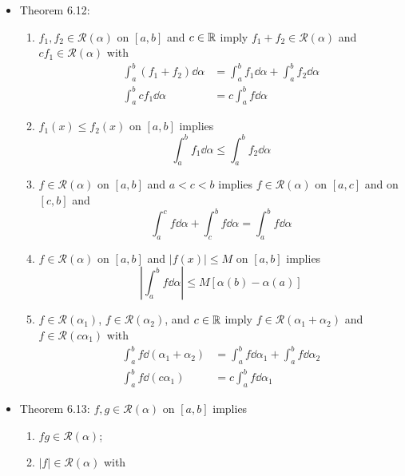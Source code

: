 \documentclass[../../notes.tex]{subfiles}
\begin{document}
\begin{itemize}
    \item Theorem 6.12:
    \begin{enumerate}[label={(\alph*)}]
        \item $f_1,f_2\in\mathscr{R}(\alpha)$ on $[a,b]$ and $c\in\mathbb{R}$ imply $f_1+f_2\in\mathscr{R}(\alpha)$ and $cf_1\in\mathscr{R}(\alpha)$ with
        \begin{align*}
            \int_a^b(f_1+f_2)\dd{\alpha} &= \int_a^bf_1\dd{\alpha}+\int_a^bf_2\dd{\alpha}\\
            \int_a^bcf_1\dd{\alpha} &= c\int_a^bf\dd{\alpha}
        \end{align*}
        \item $f_1(x)\leq f_2(x)$ on $[a,b]$ implies
        \begin{equation*}
            \int_a^bf_1\dd{\alpha} \leq \int_a^bf_2\dd{\alpha}
        \end{equation*}
        \item $f\in\mathscr{R}(\alpha)$ on $[a,b]$ and $a<c<b$ implies $f\in\mathscr{R}(\alpha)$ on $[a,c]$ and on $[c,b]$ and
        \begin{equation*}
            \int_a^cf\dd{\alpha}+\int_c^bf\dd{\alpha} = \int_a^bf\dd{\alpha}
        \end{equation*}
        \item $f\in\mathscr{R}(\alpha)$ on $[a,b]$ and $|f(x)|\leq M$ on $[a,b]$ implies
        \begin{equation*}
            \left| \int_a^bf\dd{\alpha} \right| \leq M[\alpha(b)-\alpha(a)]
        \end{equation*}
        \item $f\in\mathscr{R}(\alpha_1)$, $f\in\mathscr{R}(\alpha_2)$, and $c\in\mathbb{R}$ imply $f\in\mathscr{R}(\alpha_1+\alpha_2)$ and $f\in\mathscr{R}(c\alpha_1)$ with
        \begin{align*}
            \int_a^bf\dd{(\alpha_1+\alpha_2)} &= \int_a^bf\dd{\alpha_1}+\int_a^bf\dd{\alpha_2}\\
            \int_a^bf\dd{(c\alpha_1)} &= c\int_a^bf\dd{\alpha_1}
        \end{align*}
    \end{enumerate}
    \item Theorem 6.13: $f,g\in\mathscr{R}(\alpha)$ on $[a,b]$ implies
    \begin{enumerate}[label={(\alph*)}]
        \item $fg\in\mathscr{R}(\alpha)$;
        \item $|f|\in\mathscr{R}(\alpha)$ with
        \begin{equation*}

\end{equation*}
\end{enumerate}
\end{itemize}
\end{document}
